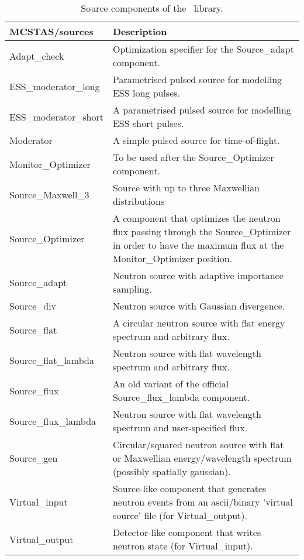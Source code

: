 \begin{table}
  \begin{center}
    {\let\my=\\
    \begin{tabular}{|p{}|p{}|}
      \hline
       MCSTAS/sources & Description \\
       \hline
Adapt\_check & Optimization specifier for the Source\_adapt component. \\
ESS\_moderator\_long & Parametrised pulsed source for modelling ESS long pulses. \\
ESS\_moderator\_short & A parametrised pulsed source for modelling ESS short pulses. \\
Moderator  & A simple pulsed source for time-of-flight. \\
Monitor\_Optimizer &  To be used after the Source\_Optimizer component. \\
Source\_Maxwell\_3 & Source with up to three Maxwellian distributions \\
Source\_Optimizer & A component that optimizes the neutron flux passing through the Source\_Optimizer in order to have the maximum flux at the Monitor\_Optimizer position. \\
Source\_adapt  &       Neutron source with adaptive importance sampling. \\
Source\_div &          Neutron source with Gaussian divergence. \\
Source\_flat &  A circular neutron source with flat energy spectrum and arbitrary flux.\\
Source\_flat\_lambda & Neutron source with flat wavelength spectrum and
arbitrary flux. \\
Source\_flux         & An old variant of the official
                      Source\_flux\_lambda component. \\
Source\_flux\_lambda  & Neutron source with flat wavelength
                      spectrum and 
                      user-specified flux. \\
Source\_gen     &    Circular/squared neutron source with flat or Maxwellian
                      energy/wavelength spectrum (possibly spatially
                      gaussian). \\
Virtual\_input &  Source-like component that generates neutron events from an ascii/binary 'virtual source' file (for Virtual\_output). \\
Virtual\_output &  Detector-like component that writes neutron state (for Virtual\_input). \\
      \hline
    \end{tabular}
    \caption{Source components of the \MCS\ library.}
    \label{t:comp-sources}
    }
  \end{center}
\end{table}


